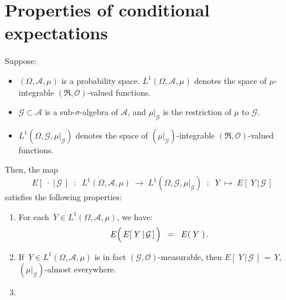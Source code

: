 

\section{Properties of conditional expectations}
\setcounter{theorem}{0}
\setcounter{equation}{0}

\renewcommand{\theenumi}{\roman{enumi}}
\renewcommand{\labelenumi}{\textnormal{(\theenumi)}$\;\;$}


\begin{theorem}
\label{Thm:PropertiesConditionalExpectation}
\mbox{}\vskip 0.2cm
\noindent
Suppose:
\begin{itemize}
\item
	$(\Omega,\mathcal{A},\mu)$ is a probability space.
	$L^{1}\!\left(\Omega,\mathcal{A},\mu\right)$ denotes the space of $\mu$-integrable $(\Re,\mathcal{O})$-valued functions.
\item
	$\mathcal{G} \subset \mathcal{A}$ is a sub-$\sigma$-algebra of $\mathcal{A}$,
	and $\mu\vert_{\mathcal{G}}$ is the restriction of $\mu$ to $\mathcal{G}$.
\item
	$L^{1}\!\left(\Omega,\mathcal{G},\mu\vert_{\mathcal{G}}\right)$ denotes the space of
	$(\mu\vert_{\mathcal{G}})$-integrable $(\Re,\mathcal{O})$-valued functions.
\end{itemize}
Then, the map
\begin{equation*}
E\!\left[\;\cdot\;\vert\,\mathcal{G}\,\right]
\;\; :\;\;
L^{1}\!\left(\Omega,\mathcal{A},\mu\right) \;\longrightarrow\; L^{1}\!\left(\Omega,\mathcal{G},\mu\vert_{\mathcal{G}}\right)
\;\; : \;\;
Y \;\longmapsto\; E\!\left[\;Y\,\vert\,\mathcal{G}\,\right]
\end{equation*}
satisfies the following properties:
\begin{enumerate}
\item
	For each \,$Y \in L^{1}\!\left(\Omega,\mathcal{A},\mu\right)$, we have:
	\begin{equation*}
	E\!\left(\,\overset{{\color{white}.}}{E}\!\left[\;Y\,\vert\,\mathcal{G}\,\right]\,\right)
	\;\; = \;\;
	E\!\left(\;Y\;\right).
	\end{equation*}
\item
	If \,$Y \in L^{1}\!\left(\Omega,\mathcal{A},\mu\right)$
	is in fact $(\mathcal{G},\mathcal{O})$-measurable,
	then $E\!\left[\;Y\,\vert\,\mathcal{G}\,\right] \,=\, Y$,
	$(\mu\vert_{\mathcal{G}})$-almost everywhere.
\item\label{ConditionalExpectationRLinearity}

\end{enumerate}
\end{theorem}
